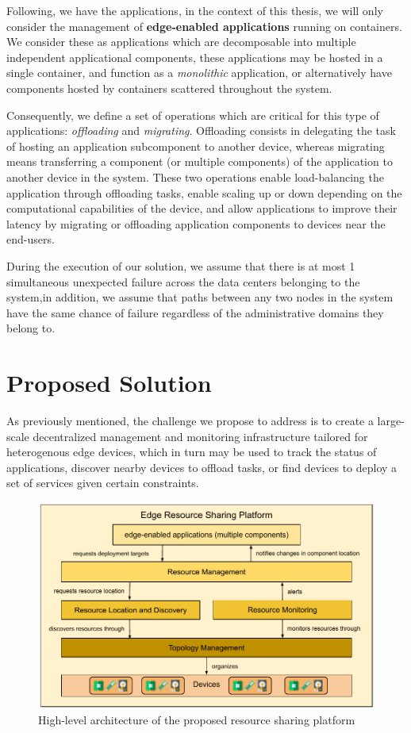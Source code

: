 Following, we have the applications, in the context of this thesis, we will only consider the management of \textbf{edge-enabled applications} running on containers. We consider these as applications which are decomposable into  multiple independent applicational components, these applications may be hosted in a single container, and function as a \textit{monolithic} application, or alternatively have components hosted by containers scattered throughout the system.

Consequently, we define a set of operations which are critical for this type of applications: \textit{offloading} and \textit{migrating}. Offloading consists in delegating the task of hosting an application subcomponent to another device, whereas migrating means transferring a component (or multiple components) of the application to another device in the system. These two operations enable load-balancing the application through offloading tasks, enable scaling up or down depending on the computational capabilities of the device, and allow applications to improve their latency by migrating or offloading application components to devices near the end-users. 

During the execution of our solution, we assume that there is at most 1 simultaneous unexpected failure across the data centers belonging to the system,in addition, we assume that paths between any two nodes in the system have the same chance of failure regardless of the administrative domains they belong to.

\section{Proposed Solution}
\label{cha:proposed_sol}

As previously mentioned, the challenge we propose to address is to create a large-scale decentralized management and monitoring infrastructure tailored for heterogenous edge devices, which in turn may be used to track the status of applications, discover nearby devices to offload tasks, or find devices to deploy a set of services given certain constraints. 

\begin{figure}
    \centering
    \includegraphics[width=0.9\linewidth]{Figures/proposed_architecture_detailed.pdf}
    \caption{High-level architecture of the proposed resource sharing platform}
    \label{fig:proposed_architecture_detailed}
\end{figure}

